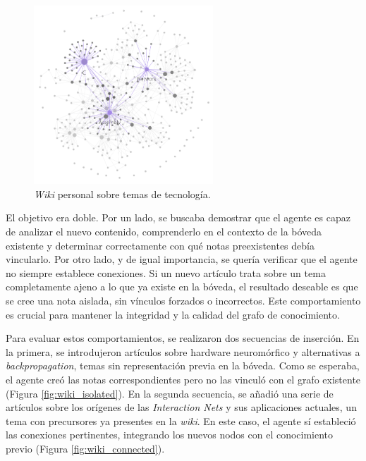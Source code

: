 \begin{figure}[h!]
    \centering
    \includegraphics[width=0.6\textwidth]{figures/WikiSamples2.png}
    \caption{\textit{Wiki} personal sobre temas de tecnología.}
    \label{fig:wiki_tech_graph}
\end{figure}

El objetivo era doble. Por un lado, se buscaba demostrar que el agente es capaz de analizar el nuevo contenido, comprenderlo en el contexto de la bóveda existente y determinar correctamente con qué notas preexistentes debía vincularlo. Por otro lado, y de igual importancia, se quería verificar que el agente no siempre establece conexiones. Si un nuevo artículo trata sobre un tema completamente ajeno a lo que ya existe en la bóveda, el resultado deseable es que se cree una nota aislada, sin vínculos forzados o incorrectos. Este comportamiento es crucial para mantener la integridad y la calidad del grafo de conocimiento.

Para evaluar estos comportamientos, se realizaron dos secuencias de inserción. En la primera, se introdujeron artículos sobre hardware neuromórfico y alternativas a \textit{backpropagation}, temas sin representación previa en la bóveda. Como se esperaba, el agente creó las notas correspondientes pero no las vinculó con el grafo existente (Figura \ref{fig:wiki_isolated}). En la segunda secuencia, se añadió una serie de artículos sobre los orígenes de las \textit{Interaction Nets} y sus aplicaciones actuales, un tema con precursores ya presentes en la \textit{wiki}. En este caso, el agente sí estableció las conexiones pertinentes, integrando los nuevos nodos con el conocimiento previo (Figura \ref{fig:wiki_connected}).

